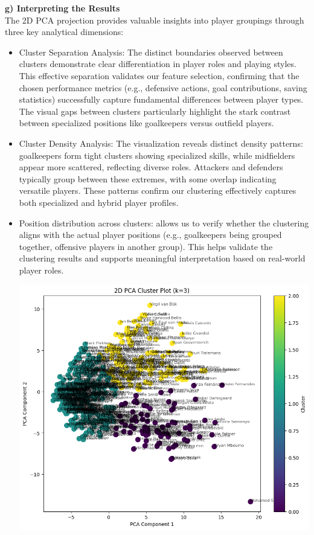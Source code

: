 \documentclass[a4paper,12pt]{article}
\begin{document}
\textbf{g) Interpreting the Results} \\
The 2D PCA projection provides valuable insights into player groupings through three key analytical dimensions:
\begin{itemize}
    \item Cluster Separation Analysis:
The distinct boundaries observed between clusters demonstrate clear differentiation in player roles and playing styles. This effective separation validates our feature selection, confirming that the chosen performance metrics (e.g., defensive actions, goal contributions, saving statistics) successfully capture fundamental differences between player types. The visual gaps between clusters particularly highlight the stark contrast between specialized positions like goalkeepers versus outfield players.
    \item Cluster Density Analysis:
The visualization reveals distinct density patterns: goalkeepers form tight clusters showing specialized skills, while midfielders appear more scattered, reflecting diverse roles. Attackers and defenders typically group between these extremes, with some overlap indicating versatile players. These patterns confirm our clustering effectively captures both specialized and hybrid player profiles.
    \item Position distribution across clusters: allows us to verify whether the clustering aligns with the actual player positions (e.g., goalkeepers being grouped together, offensive players in another group). This helps validate the clustering results and supports meaningful interpretation based on real-world player roles.

\includegraphics[width=1\textwidth]{clusters_2d.png}


\end{itemize}
\end{document}
